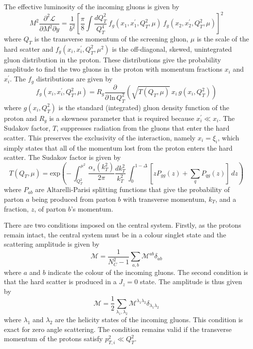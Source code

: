 The effective luminosity of the incoming gluons is given by
\begin{equation} \label{ceplumi}
M^2 \frac{\partial^2 \mathcal{L}}{\partial M^2 \partial y} = \frac{1}{b^2} \left[ 
\frac{\pi}{8} \int \frac{dQ_T^2}{Q_T^4}
\ f_g  \left(x_1,x_1^{\prime},Q_T^2, \mu \right)
\ f_g  \left(x_2,x_2^{\prime},Q_T^2, \mu \right)
\right]^2
\end{equation}
where $Q_T$ is the transverse momentum of the screening gluon, $\mu$ is the scale of the hard scatter  and $f_g(x_i,x_i^{\prime},Q_T^2,\mu^2)$ is the off-diagonal, skewed, unintegrated gluon distribution in the proton. These distributions give the probability amplitude to find the two gluons in the proton with momentum fractions $x_i$ and $x_i^{\prime}$.
The $f_g$ distributions are given by
\begin{equation}\label{uPDF}
f _g\left(x_i,x_i^{\prime},Q_T^2,\mu \right) = R_g \frac{\partial}{\partial \, \text{ln} \, Q_T^2}
\left( \sqrt{T\left(Q_T, \mu \right)} \, x_i \, g \left(x_i, Q_T^2 \right)
\right)
\end{equation}
where $g(x_i, Q_T^2)$ is the standard (integrated) gluon density function of the proton and $R_g$ is a skewness parameter that is required because $x_i^{\prime} \ll x_i$. The Sudakov factor, $T$, suppresses radiation from the gluons that enter the hard scatter. This preserves the exclusivity of the interaction, namely $x_i=\xi_i$, which simply states that all of the momentum lost from the proton enters the hard scatter. The Sudakov factor is given by
\begin{equation}
T\left(Q_T,\mu \right)= \text{exp} 
\left(
- \, \int_{Q_T^2}^{\mu^2} \frac{\alpha_s\left( k_T^2 \right)}{2\pi} \frac{dk_T^2}{k_T^2}
\, \int_0^{1 - \Delta} \left[ z P_{gg}\left( z \right) + \sum_q P_{qg}\left(z\right)\right] \, dz
\right)
\end{equation}
where $P_{ab}$ are Altarelli-Parisi splitting functions that give the probability of parton $a$ being produced from parton $b$ with transverse momentum, $k_T$, and a fraction, $z$, of parton $b$'s momentum. 

There are two conditions imposed on the central system. Firstly, as the protons remain intact, the central system must be in a colour singlet state and the scattering amplitude is given by
\begin{equation}\label{csinglet}
\mathcal{M} = \frac{1}{N_C^2 -1} \sum_{a,b} \mathcal{M}^{ab}\delta_{ab}
\end{equation}
where $a$ and $b$ indicate the colour of the incoming gluons. The second condition is that the hard scatter is produced in a $J_z = 0$ state. The amplitude is thus given by
\begin{equation}
\mathcal{M} = \frac{1}{2} \sum_{\lambda_1, \lambda_2} \mathcal{M}^{\lambda_1 \lambda_2} 
\delta_{\lambda_1 \lambda_2}
\end{equation}
where $\lambda_1$ and $\lambda_2$ are the helicity states of the incoming gluons. This condition is exact for zero angle scattering. The condition remains valid if the transverse momentum of the protons satisfy $p_{T, i}^2 \ll Q_T^2$.

